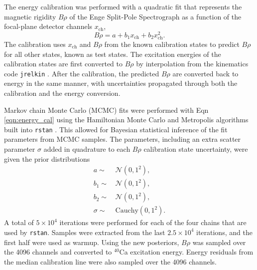 The energy calibration was performed with a quadratic fit that represents the magnetic rigidity $B\rho$ of the Enge Split-Pole Spectrograph as a function of the focal-plane detector channels $x_{\mathrm{ch}}$,
\begin{equation} \label{eqn:energy_cal}
B\rho = a + b_{1}x_{\mathrm{ch}} + b_{2} x_{\mathrm{ch}}^{2}.
\end{equation}
The calibration uses $x_{\mathrm{ch}}$ and $B\rho$ from the known calibration states to predict $B\rho$ for all other states, known as test states. The excitation energies of the calibration states are first converted to $B\rho$ by interpolation from the kinematics code \texttt{jrelkin} \cite{jrelkin}. After the calibration, the predicted $B\rho$ are converted back to energy in the same manner, with uncertainties propagated through both the calibration and the energy conversion.

Markov chain Monte Carlo (MCMC) fits were performed with Eqn \ref{eqn:energy_cal} using the Hamiltonian Monte Carlo and Metropolis algorithms built into \texttt{rstan} \cite{Stan,Rstan}. This allowed for Bayesian statistical inference of the fit parameters from MCMC samples. The parameters, including an extra scatter parameter $\sigma$ added in quadrature to each $B\rho$ calibration state uncertainty, were given the prior distributions
\begin{align}
a \sim& \, \mathcal{N}(0,1^{2}), \nonumber \\
b_{1} \sim& \, \mathcal{N}(0,1^{2}), \nonumber \\
b_{2} \sim& \, \mathcal{N}(0,1^{2}), \nonumber \\
\sigma \sim& \, \mathrm{Cauchy}(0,1^{2}).
\end{align}
A total of $5 \times 10^{4}$ iterations were performed for each of the four chains that are used by \texttt{rstan}. Samples were extracted from the last $2.5 \times 10^{4}$ iterations, and the first half were used as warmup. Using the new posteriors, $B\rho$ was sampled over the 4096 channels and converted to $^{40}$Ca excitation energy. Energy residuals from the median calibration line were also sampled over the 4096 channels.

